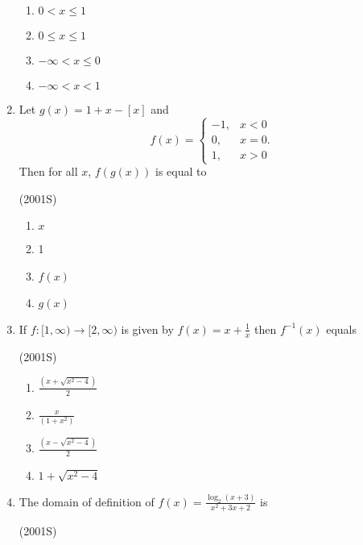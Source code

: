 \documentclass[journal,12pt,twocolumn]{IEEEtran}
\theoremstyle{remark}
\begin{document}
\begin{enumerate}
\begin{multicols}{2}
	\begin{enumerate}
		\item $0<x\le1$ 
		\item $0\le x\le1$
		\item $-\infty<x\le0$ 
		\item $-\infty<x<1$
	\end{enumerate}
\end{multicols}

\item Let $g(x)=1+x-[x]$ and
\begin{equation}
f(x)=
\begin{cases}
-1, & \text{$x<0$} \\
0, & \text{$x=0$.} \\
1, & \text{$x>0$}
\end{cases}
\end{equation}
Then for all $x$, $f(g(x))$ is equal to

\hfill{(2001S)}

\begin{multicols}{2}
	\begin{enumerate}
		\item $x$ 
		\item 1
		\item $f(x)$ 
		\item $g(x)$
	\end{enumerate}
\end{multicols}

\item If $f:[1,\infty)\to[2,\infty)$ is given by $f(x)=x+\frac{1}{x}$ then $f^{-1}(x)$ equals

\hfill{(2001S)}

\begin{multicols}{2}
	\begin{enumerate}
		\item $\frac{(x+\sqrt{x^{2}-4})}{2}$ 
		\item $\frac{x}{(1+x^{2})}$
		\item $\frac{(x-\sqrt{x^{2}-4})}{2}$ 
		\item $1+\sqrt{x^{2}-4}$
	\end{enumerate}
\end{multicols}

\item The domain of definition of $f(x)=\frac{\log_{2}{(x+3)}}{x^{2}+3x+2}$ is

\hfill{(2001S)}


\end{enumerate}
\end{document}

